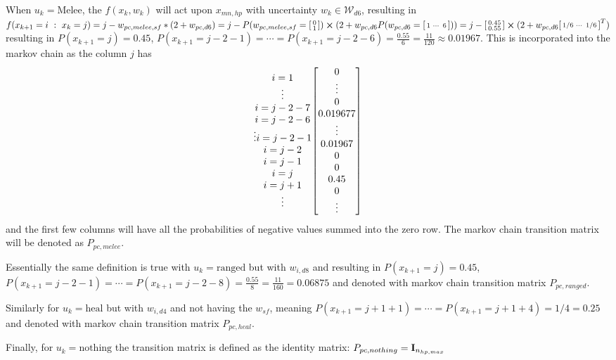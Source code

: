\documentclass[9pt, onecolumn]{report}
\newcommand{\st}{\ : \ }
\begin{document}
When $u_k = \text{Melee}$, the $f(x_k,w_k)$ will act upon $x_{mn,hp}$ with uncertainty $w_k \in \mathcal{W}_{d6}$, resulting in$
    f(x_{k+1} = i \st x_{k}=j) = j - w_{pc,melee,sf}*(2+w_{pc,d6}) = j - P(w_{pc,melee,sf}=\smqty[0\\1])\cross (2+w_{pc,d6}P(w_{pc,d6}=\smqty[1&\cdots&6])) = j - \smqty[0.45\\0.55] \cross (2+w_{pc,d6}\smqty[1/6& \cdots & 1/6]^T)
$
resulting in $P(x_{k+1} = j) = 0.45$, $P(x_{k+1} = j-2-1) = \cdots = P(x_{k+1} = j-2-6) = \frac{0.55}{6} = \frac{11}{120} \approx 0.01967$.
This is incorporated into the markov chain as the column $j$ has \[
    \mqty{i=1 \\ \vdots \\ i=j-2-7 \\ i=j-2-6\\ \vdots i = j-2-1 \\ i = j-2\\ i= j-1 \\ i=j \\ i=j+1\\ \vdots} \mqty [0\\ \vdots \\ 0\\ 0.019677\\ \vdots \\ 0.01967 \\ 0\\ 0 \\ 0.45 \\ 0 \\ \vdots ]
\]
and the first few columns will have all the probabilities of negative values summed into the zero row.
The markov chain transition matrix will be denoted as $P_{pc,melee}$.

Essentially the same definition is true with $u_k = \text{ranged}$ but with $w_{i,d8}$ and resulting in $P(x_{k+1} = j) = 0.45$, $P(x_{k+1} = j-2-1) = \cdots = P(x_{k+1} = j-2-8) = \frac{0.55}{8} = \frac{11}{160} = 0.06875$ and denoted with markov chain transition matrix $P_{pc,ranged}$.

Similarly for $u_k = \text{heal}$ but with $w_{i,d4}$ and not having the $w_{sf}$, meaning $P(x_{k+1} = j+1+1) = \cdots = P(x_{k+1} = j+1+4) = 1/4 = 0.25$ and denoted with markov chain transition matrix $P_{pc,heal}$.

Finally, for $u_k = \text{nothing}$ the transition matrix is defined as the identity matrix: $P_{pc,nothing} = \vb{I}_{n_{hp,max}}$
\end{document}
